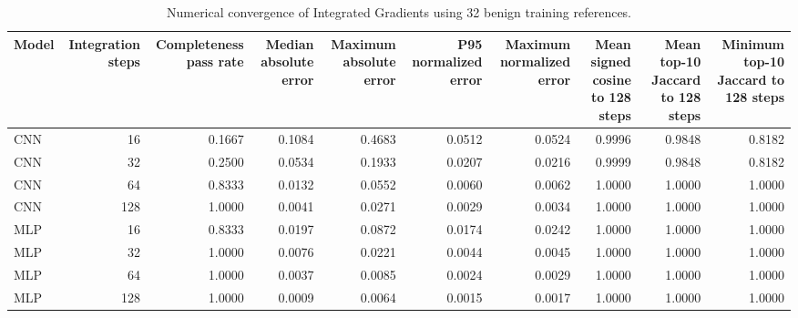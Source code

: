\begin{table}
\caption{Numerical convergence of Integrated Gradients using 32 benign training references.}
\label{tab:ig_numerical_convergence}
\begin{tabular}{lrrrrrrrrr}
\toprule
Model & Integration steps & Completeness pass rate & Median absolute error & Maximum absolute error & P95 normalized error & Maximum normalized error & Mean signed cosine to 128 steps & Mean top-10 Jaccard to 128 steps & Minimum top-10 Jaccard to 128 steps \\
\midrule
CNN & 16 & 0.1667 & 0.1084 & 0.4683 & 0.0512 & 0.0524 & 0.9996 & 0.9848 & 0.8182 \\
CNN & 32 & 0.2500 & 0.0534 & 0.1933 & 0.0207 & 0.0216 & 0.9999 & 0.9848 & 0.8182 \\
CNN & 64 & 0.8333 & 0.0132 & 0.0552 & 0.0060 & 0.0062 & 1.0000 & 1.0000 & 1.0000 \\
CNN & 128 & 1.0000 & 0.0041 & 0.0271 & 0.0029 & 0.0034 & 1.0000 & 1.0000 & 1.0000 \\
MLP & 16 & 0.8333 & 0.0197 & 0.0872 & 0.0174 & 0.0242 & 1.0000 & 1.0000 & 1.0000 \\
MLP & 32 & 1.0000 & 0.0076 & 0.0221 & 0.0044 & 0.0045 & 1.0000 & 1.0000 & 1.0000 \\
MLP & 64 & 1.0000 & 0.0037 & 0.0085 & 0.0024 & 0.0029 & 1.0000 & 1.0000 & 1.0000 \\
MLP & 128 & 1.0000 & 0.0009 & 0.0064 & 0.0015 & 0.0017 & 1.0000 & 1.0000 & 1.0000 \\
\bottomrule
\end{tabular}
\end{table}
